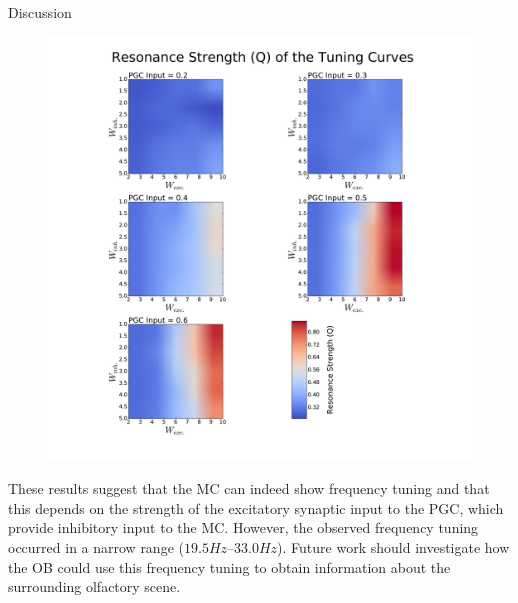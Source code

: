 \documentclass[final,hyperref={pdfpagelabels=false}]{beamer}
\begin{document}
\begin{frame}{}
\begin{columns}[t]
\begin{column}{.48\linewidth}
      \begin{block}{Discussion}
      	\begin{figure}
      		\center
      		\includegraphics[scale=0.5]{images/Contour_plot_tuning_strength}
      		\end{figure} 
        These results suggest that the MC can indeed show frequency tuning and that this depends on the strength of the excitatory synaptic input to the PGC, which provide inhibitory input to the MC.
        However, the observed frequency tuning occurred in a narrow range ($19.5Hz – 33.0Hz$).
        Future work should investigate how the OB could use this frequency tuning to obtain information about the surrounding olfactory scene.
      \end{block}
    \end{column}
  \end{columns}
\end{frame}
\end{document}
